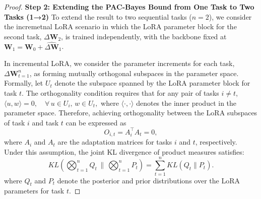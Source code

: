 \documentclass[letterpaper]{article} %
\begin{document}
\begin{proof}
\textbf{Step 2: Extending the PAC-Bayes Bound from One Task to Two Tasks  (1→2)}
To extend the result to two sequential tasks ($n=2$), we consider the incremetnal LoRA scenario in which the LoRA parameter block for the second task, $\Delta\mathbf{W}_2$, is trained independently, with the backbone fixed at $\mathbf{W}_1 = \mathbf{W}_0 + \hat{\Delta\mathbf{W}}_1$. 


In incremental LoRA, we consider the parameter increments for each task, ${\Delta\mathbf{W}}_{t=1}^n$, as forming mutually orthogonal subspaces in the parameter space. Formally, let $U_t$ denote the subspace spanned by the LoRA parameter block for task $t$. The orthogonality condition requires that for any pair of tasks $i \neq t$,
$\langle u, w \rangle = 0, \quad \forall\, u \in U_i,\, w \in U_t,$
where $\langle \cdot, \cdot \rangle$ denotes the inner product in the parameter space. Therefore, achieving orthogonality between the LoRA subspaces of task $i$ and task $t$ can be expressed as
$${O}_{i,t} = A_i^{\top} A_t = 0,$$
where $A_i$ and $A_t$ are the adaptation matrices for tasks $i$ and $t$, respectively. Under this assumption, the joint KL divergence of product measures satisfies:   \begin{equation}
      KL\left(\bigotimes_{t=1}^n Q_t \, \bigg\| \, \bigotimes_{t=1}^n P_t\right) = \sum_{t=1}^n KL(Q_t \| P_t).
  \end{equation}
where $Q_t$ and $P_t$ denote the posterior and prior distributions over the LoRA parameters for task $t$.




\end{proof}
\end{document}
